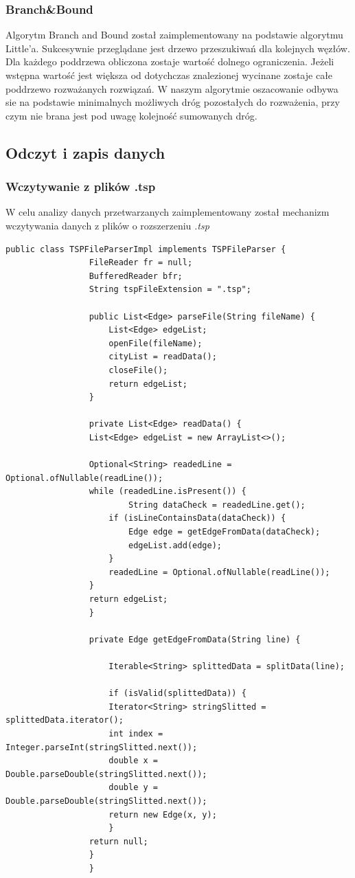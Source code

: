\documentclass{article}
\begin{document}
		\subsubsection{Branch\&Bound}
			Algorytm Branch and Bound został zaimplementowany na podstawie algorytmu Little'a. Sukcesywnie przeglądane jest drzewo przeszukiwań dla kolejnych węzłów. Dla każdego poddrzewa obliczona zostaje wartość dolnego ograniczenia. Jeżeli wstępna wartość jest większa od dotychczas znalezionej wycinane zostaje całe poddrzewo rozważanych rozwiązań. W naszym algorytmie oszacowanie odbywa sie na podstawie minimalnych możliwych dróg pozostałych do rozważenia, przy czym nie brana jest pod uwagę kolejność sumowanych dróg. 
	\subsection{Odczyt i zapis danych}
		\subsubsection{Wczytywanie z plików .tsp}
			W celu analizy danych przetwarzanych zaimplementowany został mechanizm wczytywania danych z plików o rozszerzeniu {\it .tsp}
			
				\begin{lstlisting}[xleftmargin=-150pt]
				public class TSPFileParserImpl implements TSPFileParser {
				 FileReader fr = null;
				 BufferedReader bfr;
				 String tspFileExtension = ".tsp";
				 
				 public List<Edge> parseFile(String fileName) {
					 List<Edge> edgeList;
					 openFile(fileName);
					 cityList = readData();
					 closeFile();
					 return edgeList;
				 }
				 
				 private List<Edge> readData() {
				 List<Edge> edgeList = new ArrayList<>();
				 
				 Optional<String> readedLine = Optional.ofNullable(readLine());
				 while (readedLine.isPresent()) {
						 String dataCheck = readedLine.get();
					 if (isLineContainsData(dataCheck)) {
						 Edge edge = getEdgeFromData(dataCheck);
						 edgeList.add(edge);
					 }
					 readedLine = Optional.ofNullable(readLine());
				 }
				 return edgeList;
				 }
				 					 
				 private Edge getEdgeFromData(String line) {
				 
					 Iterable<String> splittedData = splitData(line);
					 
					 if (isValid(splittedData)) {
					 Iterator<String> stringSlitted = splittedData.iterator();
					 int index = Integer.parseInt(stringSlitted.next());
					 double x = Double.parseDouble(stringSlitted.next());
					 double y = Double.parseDouble(stringSlitted.next());
					 return new Edge(x, y);
					 }
				 return null;
				 }
				 }
				\end{lstlisting}
		
\end{document}
